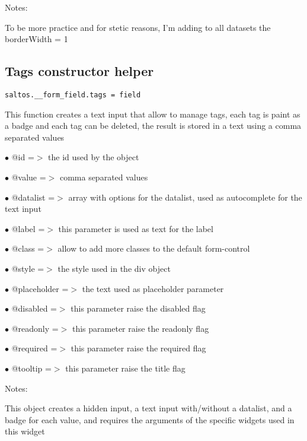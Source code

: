 \documentclass[a4paper]{book}
\begin{document}
Notes:

To be more practice and for stetic reasons, I'm adding to all datasets the borderWidth = 1

\hypertarget{toc402}{}
\subsection{Tags constructor helper}

\begin{lstlisting}
saltos.__form_field.tags = field
\end{lstlisting}

This function creates a text input that allow to manage tags, each tag is paint as a badge
and each tag can be deleted, the result is stored in a text using a comma separated values

\begin{compactitem}
\item[\color{myblue}$\bullet$] @id          =$>$ the id used by the object
\item[\color{myblue}$\bullet$] @value       =$>$ comma separated values
\item[\color{myblue}$\bullet$] @datalist    =$>$ array with options for the datalist, used as autocomplete for the text input
\item[\color{myblue}$\bullet$] @label       =$>$ this parameter is used as text for the label
\item[\color{myblue}$\bullet$] @class       =$>$ allow to add more classes to the default form-control
\item[\color{myblue}$\bullet$] @style       =$>$ the style used in the div object
\item[\color{myblue}$\bullet$] @placeholder =$>$ the text used as placeholder parameter
\item[\color{myblue}$\bullet$] @disabled    =$>$ this parameter raise the disabled flag
\item[\color{myblue}$\bullet$] @readonly    =$>$ this parameter raise the readonly flag
\item[\color{myblue}$\bullet$] @required    =$>$ this parameter raise the required flag
\item[\color{myblue}$\bullet$] @tooltip     =$>$ this parameter raise the title flag
\end{compactitem}

Notes:

This object creates a hidden input, a text input with/without a datalist, and a badge for
each value, and requires the arguments of the specific widgets used in this widget
\end{document}
